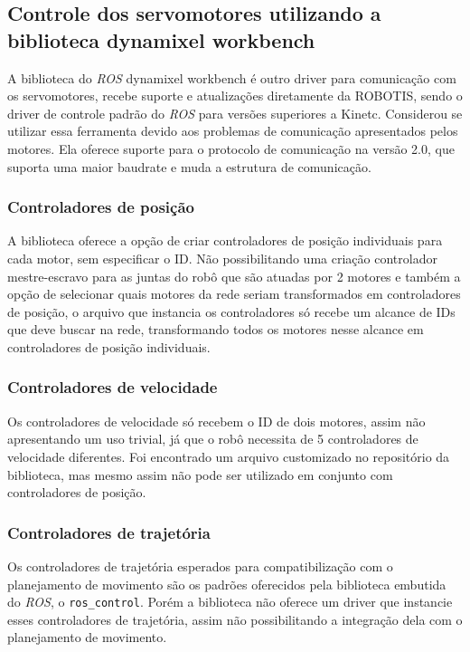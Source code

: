 \subsection{Controle dos servomotores utilizando a biblioteca dynamixel workbench}
A biblioteca do \textit{ROS} dynamixel workbench  é outro driver para comunicação com os servomotores, recebe suporte e atualizações diretamente da ROBOTIS, sendo o driver de controle padrão do \textit{ROS} para versões superiores a Kinetc. Considerou se utilizar essa ferramenta devido aos problemas de comunicação apresentados pelos motores. Ela oferece suporte para o protocolo de comunicação na versão 2.0, que suporta uma maior baudrate e muda a estrutura de comunicação.

\subsubsection{Controladores de posição}
A biblioteca oferece a opção de criar controladores de posição individuais para cada motor, sem especificar o ID. Não possibilitando uma criação controlador mestre-escravo para as juntas do robô que são atuadas por 2 motores e também a opção de selecionar quais motores da rede seriam transformados em controladores de posição, o arquivo que instancia os controladores só recebe um alcance de IDs que deve buscar na rede, transformando todos os motores nesse alcance em controladores de posição individuais.

\subsubsection{Controladores de velocidade}
Os controladores de velocidade só recebem o ID de dois motores, assim não apresentando um uso trivial, já que o robô necessita de 5 controladores de velocidade diferentes. Foi encontrado um arquivo customizado no repositório da biblioteca, mas mesmo assim não pode ser utilizado em conjunto com controladores de posição.

\subsubsection{Controladores de trajetória}
Os controladores de trajetória esperados para compatibilização com o planejamento de movimento são os padrões oferecidos pela biblioteca embutida do \textit{ROS}, o \verb|ros_control|. Porém a biblioteca não oferece um driver que instancie esses controladores de trajetória, assim não possibilitando a integração dela com o planejamento de movimento.

